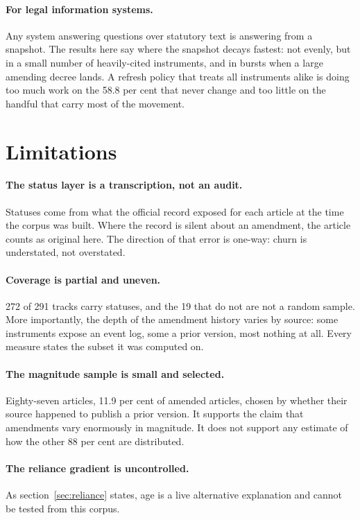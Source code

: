 \documentclass[11pt]{article}
\begin{document}
\paragraph{For legal information systems.} Any system answering questions over
statutory text is answering from a snapshot. The results here say where the
snapshot decays fastest: not evenly, but in a small number of heavily-cited
instruments, and in bursts when a large amending decree lands. A refresh policy
that treats all instruments alike is doing too much work on the 58.8 per cent
that never change and too little on the handful that carry most of the
movement.

\section{Limitations}

\paragraph{The status layer is a transcription, not an audit.} Statuses come
from what the official record exposed for each article at the time the corpus
was built. Where the record is silent about an amendment, the article counts
as original here. The direction of that error is one-way: churn is understated,
not overstated.

\paragraph{Coverage is partial and uneven.} 272 of 291 tracks carry statuses,
and the 19 that do not are not a random sample. More importantly, the depth of
the amendment history varies by source: some instruments expose an event log,
some a prior version, most nothing at all. Every measure states the subset it
was computed on.

\paragraph{The magnitude sample is small and selected.} Eighty-seven articles,
11.9 per cent of amended articles, chosen by whether their source happened to
publish a prior version. It supports the claim that amendments vary enormously
in magnitude. It does not support any estimate of how the other 88 per cent are
distributed.

\paragraph{The reliance gradient is uncontrolled.} As section~\ref{sec:reliance}
states, age is a live alternative explanation and cannot be tested from this
corpus.
\end{document}
